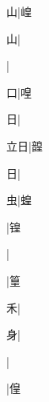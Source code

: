 \begin{multicols}{2}
{{\cjk{}{\cnsym{}　}{\cnsym{}　}山}|{\cjk{}崲}\par
{\cjk{}{\cnsym{}　}{\cnsym{}　}山}|{}\par
{}|{}\par
{\cjk{}{\cnsym{}　}{\cnsym{}　}口}|{\cjk{}喤}\par
{\cjk{}{\cnsym{}　}{\cnsym{}　}日}|{}\par
{\cjk{}{\cnsym{}　}立日}|{\cjk{}韹}\par
{日}|{}\par
{\cjk{}{\cnsym{}　}{\cnsym{}　}虫}|{\cjk{}蝗}\par
{}|{\cjk{}锽}\par
{}|{}\par
{}|{\cjk{}篁}\par
{\cjk{}{\cnsym{}　}{\cnsym{}　}禾}|{}\par
{\cjk{}{\cnsym{}　}{\cnsym{}　}身}|{}\par
{}|{}\par
{}|{\cjk{}偟}\par
}
\end{multicols}
